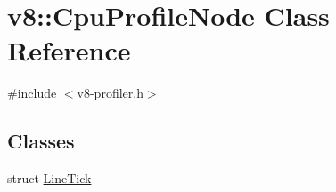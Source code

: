 \hypertarget{classv8_1_1CpuProfileNode}{}\section{v8\+:\+:Cpu\+Profile\+Node Class Reference}
\label{classv8_1_1CpuProfileNode}


{\ttfamily \#include $<$v8-\/profiler.\+h$>$}

\subsection*{Classes}
\begin{DoxyCompactItemize}
\item 
struct \mbox{\hyperlink{structv8_1_1CpuProfileNode_1_1LineTick}{Line\+Tick}}
\end{DoxyCompactItemize}
